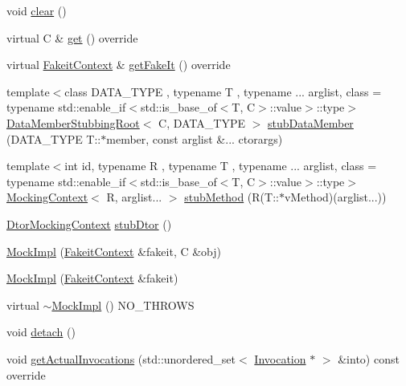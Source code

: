 \begin{DoxyCompactItemize}
void \mbox{\hyperlink{classfakeit_1_1MockImpl_a3985505d2ec7bd50a5d71f155c5ae458}{clear}} ()
\item 
virtual C \& \mbox{\hyperlink{classfakeit_1_1MockImpl_a8f287e857fde9a0941c618ff5459bd88}{get}} () override
\item 
virtual \mbox{\hyperlink{structfakeit_1_1FakeitContext}{Fakeit\+Context}} \& \mbox{\hyperlink{classfakeit_1_1MockImpl_a1b51dd1918a32ec5d450fc804ad37e63}{get\+Fake\+It}} () override
\item 
{\footnotesize template$<$class D\+A\+T\+A\+\_\+\+T\+Y\+PE , typename T , typename ... arglist, class  = typename std\+::enable\+\_\+if$<$std\+::is\+\_\+base\+\_\+of$<$\+T, C$>$\+::value$>$\+::type$>$ }\\\mbox{\hyperlink{classfakeit_1_1DataMemberStubbingRoot}{Data\+Member\+Stubbing\+Root}}$<$ C, D\+A\+T\+A\+\_\+\+T\+Y\+PE $>$ \mbox{\hyperlink{classfakeit_1_1MockImpl_acaa4bcb3984d3ca5fd1ecb3095393951}{stub\+Data\+Member}} (D\+A\+T\+A\+\_\+\+T\+Y\+PE T\+::$\ast$member, const arglist \&... ctorargs)
\item 
{\footnotesize template$<$int id, typename R , typename T , typename ... arglist, class  = typename std\+::enable\+\_\+if$<$std\+::is\+\_\+base\+\_\+of$<$\+T, C$>$\+::value$>$\+::type$>$ }\\\mbox{\hyperlink{classfakeit_1_1MockingContext}{Mocking\+Context}}$<$ R, arglist... $>$ \mbox{\hyperlink{classfakeit_1_1MockImpl_a603befd40e35ea88c7efee965f15bb60}{stub\+Method}} (R(T\+::$\ast$v\+Method)(arglist...))
\item 
\mbox{\hyperlink{classfakeit_1_1DtorMockingContext}{Dtor\+Mocking\+Context}} \mbox{\hyperlink{classfakeit_1_1MockImpl_ae64cb908c91a96faefbf0fabac948f29}{stub\+Dtor}} ()
\item 
\mbox{\hyperlink{classfakeit_1_1MockImpl_aeabb99e36f2ef5fea7856db165fe01d3}{Mock\+Impl}} (\mbox{\hyperlink{structfakeit_1_1FakeitContext}{Fakeit\+Context}} \&fakeit, C \&obj)
\item 
\mbox{\hyperlink{classfakeit_1_1MockImpl_ae6f86001c16b110046453433ba2d36e8}{Mock\+Impl}} (\mbox{\hyperlink{structfakeit_1_1FakeitContext}{Fakeit\+Context}} \&fakeit)
\item 
virtual \mbox{\hyperlink{classfakeit_1_1MockImpl_aafbd9e9c1f6691f7cee440c52ae07220}{$\sim$\+Mock\+Impl}} () N\+O\+\_\+\+T\+H\+R\+O\+WS
\item 
void \mbox{\hyperlink{classfakeit_1_1MockImpl_a48e09b74451cf9c435aab31b077cce26}{detach}} ()
\item 
void \mbox{\hyperlink{classfakeit_1_1MockImpl_a04c3121eb7d380226f1beabf4b18ee82}{get\+Actual\+Invocations}} (std\+::unordered\+\_\+set$<$ \mbox{\hyperlink{structfakeit_1_1Invocation}{Invocation}} $\ast$ $>$ \&into) const override

\end{DoxyCompactItemize}
